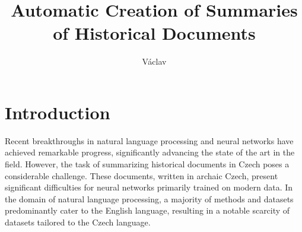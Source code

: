 \documentclass[english, ba, kiv, he, iso690numb, pdf, viewonly]{fasthesis}
\title{Automatic Creation of Summaries of Historical Documents}
\author{Václav}{Tran}{}{}
\begin{document}
\frontpages[tm] %
\tableofcontents
% 
%
\makeatletter%
\ifx\FASThesis@style\c@fullcolor%
\else%
\fi%
\makeatother%
%
%
%
%
\chapter{Introduction}
Recent breakthroughs in natural language processing and neural networks have achieved remarkable progress, significantly advancing the state of the art in the field. However, the task of summarizing historical documents in Czech poses a considerable challenge. These documents, written in archaic Czech, present significant difficulties for neural networks primarily trained on modern data. In the domain of natural language processing, a majority of methods and datasets predominantly cater to the English language, resulting in a notable scarcity of datasets tailored to the Czech language.
\end{document}
